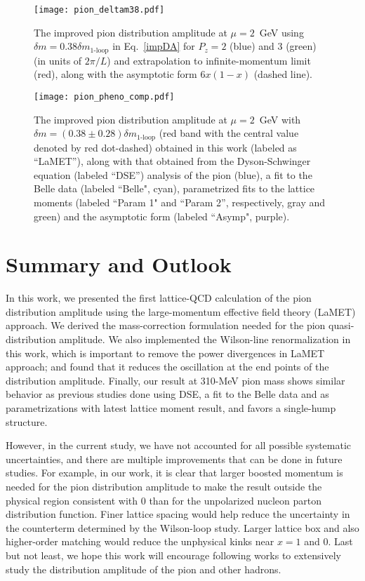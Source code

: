 \begin{figure}[tbp]
\texttt{[image: pion\_deltam38.pdf]}
\caption{The improved pion distribution amplitude at $\mu=2$~GeV using $\delta m=0.38\delta m_{\text{1-loop}}$ in Eq.~\ref{impDA} for $P_z=2$ (blue) and $3$ (green) (in units of $2\pi/L$) 
and extrapolation to infinite-momentum limit (red), along with the asymptotic form $6x(1-x)$ (dashed line).
}
\label{fig:pionDApheno}
\end{figure}

\begin{figure}[tbp]
\texttt{[image: pion\_pheno\_comp.pdf]}
\caption{The improved pion distribution amplitude at $\mu=2$~GeV with $\delta m=(0.38 \pm 0.28)\delta m_{\text{1-loop}}$ (red band with the central value denoted by red dot-dashed) obtained in this work (labeled as ``LaMET''), along with that obtained from the Dyson-Schwinger equation (labeled ``DSE'') analysis of the pion (blue), a fit to the Belle data (labeled ``Belle", cyan), parametrized fits to the lattice moments (labeled ``Param 1" and ``Param 2'', respectively, gray and green) and the asymptotic form (labeled ``Asymp", purple).
}
\label{fig:x}
\end{figure}


\section{Summary and Outlook}\label{sec:sum}
In this work, we presented the first lattice-QCD calculation of the pion distribution amplitude using the large-momentum
effective field theory (LaMET) approach. 
We derived the mass-correction formulation needed for the pion quasi-distribution amplitude. 
We also implemented the Wilson-line renormalization in this work, which is important to remove the power divergences in LaMET approach; and found that it reduces the oscillation at the end points of the distribution amplitude.
Finally, our result at 310-MeV pion mass shows similar behavior as previous studies done using DSE, a fit to the Belle data and as parametrizations with latest lattice moment result, and favors a single-hump structure.

However, in the current study, we have not accounted for all possible systematic uncertainties, and there are multiple improvements that can be done in future studies. For example, in our work, it is clear that larger boosted momentum is needed for the pion distribution amplitude to make the result outside the physical region consistent with $0$ than for the unpolarized nucleon parton distribution function. Finer lattice spacing would help reduce the uncertainty in the counterterm determined by the Wilson-loop study. Larger lattice box and also higher-order matching would reduce the unphysical kinks near $x=1$ and $0$. Last but not least, we hope this work will encourage following works to extensively study the distribution amplitude of the pion and other hadrons. 

